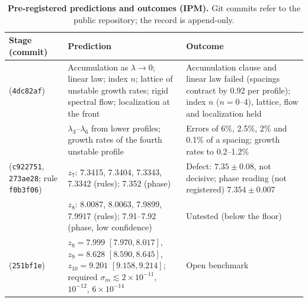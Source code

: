 \documentclass[11pt]{article}
\begin{document}
\begin{table}[h]
\centering
\caption{\textbf{Pre-registered predictions and outcomes (IPM).} Git commits refer to the public repository; the
record is append-only.}
\small
\begin{tabular}{>{\raggedright\arraybackslash}p{2.3cm}>{\raggedright\arraybackslash}p{6.4cm}>{\raggedright\arraybackslash}p{5.9cm}}
\toprule
Stage (commit) & Prediction & Outcome\\
\midrule
1 (\texttt{4dc82af}) & Accumulation as $\lambda\to0$; linear law; index $n$; lattice of unstable growth rates;
rigid spectral flow; localization at the front & Accumulation clause and linear law failed (spacings contract by
0.92 per profile); index $n$ ($n=0$--4), lattice, flow and localization held\\
2 & $\lambda_3$--$\lambda_6$ from lower profiles; growth rates of the fourth unstable profile & Errors of 6\%, 2.5\%,
2\% and 0.1\% of a spacing; growth rates to 0.2--1.2\%\\
3 (\texttt{c922751}, \texttt{273ae28}; rule \texttt{f0b3f06}) & $z_7$: 7.3415, 7.3404, 7.3343, 7.3342 (rules); 7.352
(phase) & Defect: $7.35\pm0.08$, not decisive; phase reading (not registered) $7.354\pm0.007$\\
3 & $z_8$: 8.0087, 8.0063, 7.9899, 7.9917 (rules); 7.91--7.92 (phase, low confidence) & Untested (below the floor)\\
4 (\texttt{251bf1e}) & $z_8=7.999$ $[7.970,8.017]$, $z_9=8.628$ $[8.590,8.645]$, $z_{10}=9.201$ $[9.158,9.214]$;
required $\sigma_m\lesssim2\times10^{-11}$, $10^{-12}$, $6\times10^{-14}$ & Open benchmark\\
\bottomrule
\end{tabular}
\label{tab:2}
\end{table}
\end{document}
